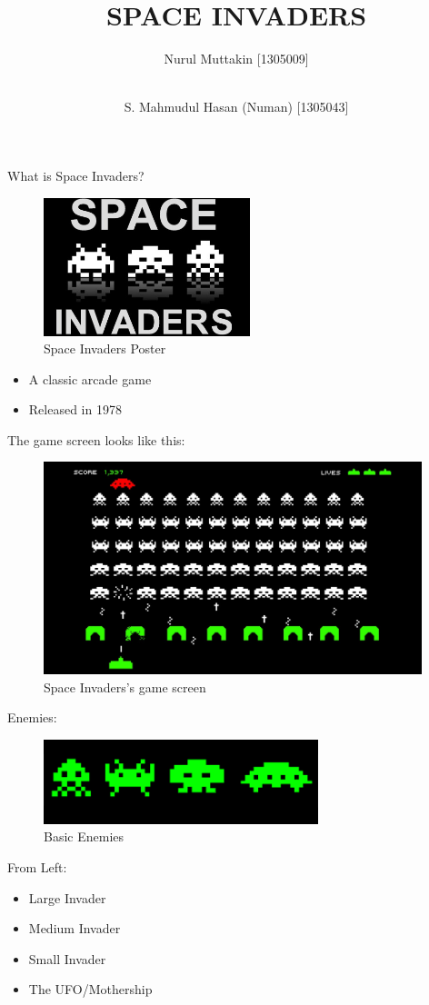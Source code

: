 \documentclass[15pt]{beamer}
\title{SPACE INVADERS}
\author[Muttakin \and Numan]{Nurul Muttakin [1305009] \and \\ S. Mahmudul Hasan (Numan) [1305043]}
\institute[BUET]{Bangladesh University of Engineering and Technology}
\date{}
\begin{document}
\begin{frame}
\titlepage
\end{frame}

\begin{frame}
What is Space Invaders?

	\begin{figure}[ht!]
		\centering
		\includegraphics[width=60mm]{space-invaders-2.jpg}
		\caption{Space Invaders Poster}
	\end{figure}


    \begin{itemize}
        \item A classic arcade game 
        \item Released in 1978
    \end{itemize}
\end{frame}

\begin{frame}
The game screen looks like this:
\begin{figure}[ht!]
\centering
\includegraphics[width=110mm]{space_invaders_screen.jpg}
\caption{Space Invaders's game screen}
\end{figure}
\end{frame}

\begin{frame}
Enemies:
	\begin{figure}[ht!]
	\centering
	\includegraphics[width=80mm]{basic_enemies.png}
	\caption{Basic Enemies}
	\end{figure}
From Left:
	\begin{itemize}
		\item Large Invader
		\item Medium Invader
		\item Small Invader
		\item The UFO/Mothership
	\end{itemize}
\end{frame}
\end{document}
